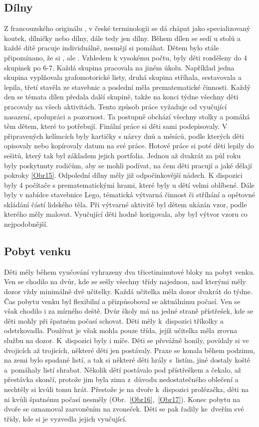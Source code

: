		\subsection{Dílny}
			Z francouzského originálu , v české terminologii se dá chápat jako specializovaný koutek, dílničky nebo dílny, dále tedy jen dílny. 
			Během dílen se sedí u stolů a každé dítě pracuje individuálně, nesmějí si pomáhat. Dětem bylo stále připomínano, že si , ale . Vzhledem k vysokému počtu, byly děti rozděleny do 4 skupinek po 6-7. Každá skupina pracovala na jiném úkolu. Například jedna skupina vyplňovala grafomotorické listy, druhá skupina stříhala, sestavovala a lepila, třetí stavěla ze stavebnic a poslední měla prematematické činnosti. Každý den se témata dílen předala další skupině, takže na konci týdne všechny děti pracovaly na všech aktivitách. Tento způsob práce vyžaduje od vyučující nasazení, spolupráci a pozornost. Ta postupně obchází všechny stolky a pomáhá těm dětem, které to potřebují. Finální práce si děti sami podepisovaly. V připravených kelímcích byly kartičky s názvy dnů a měsíců, podle kterých děti opisovaly nebo kopírovaly datum na své práce. Hotové práce si poté děti lepily do sešitů, který tak byl základem jejich portfolia. Jednou až dvakrát za půl roku byly poskytnuty rodičům, aby se mohli podívat, na čem děti pracují a jaké dělají pokroky \ref{Obr15}. Odpolední dílny měly již odpočinkovější nádech. K dispozici byly 4 počítače s prematematickými hrami, které byly u dětí velmi oblíbené. Dále byly v nabídce stavebnice Lego, tématická výtvarná činnost či stříhání a opětovné skládání částí lidského těla. Při výtvarné aktivitě byl dětem ukázán vzor, podle kterého měly malovat. Vyučující děti hodně korigovala, aby byl výtvor vzoru co nejpodobnější.


		\subsection{Pobyt venku}
		\label{prestavka}
			Děti měly během vyučování vyhrazeny dva třicetiminutové bloky na pobyt venku. Ven se chodilo na dvůr, kde se sešly všechny třídy najednou, nad kterými měly dozor vždy minimálně dvě učitelky. Každá učitelka měla dozor dvakrát do týdne. Čas pobytu venku byl flexibilní a přizpůsoboval se aktuálnímu počasí. Ven se však chodilo i za mírného deště. Dvůr školy má na jedné straně přístřešek, kde se děti mohly při špatném počasí schovat. Děti měly k dispozici tříkolky a odstrkovadla. Používat je však mohla pouze třída, jejíž učitelka měla zrovna službu na dozor. K dispozici byly i míče. Děti se převážně honily, povídaly si ve dvojicích až trojicích, některé děti jen postávaly. Praxe se konala během podzimu, na zemi bylo spadané listí, a tak si některé děti hrály s listím, jiné dostaly koště a pomáhaly listí shrabat. Několik dětí postávalo pod přístřeškem a čekalo, až přestávka skončí, protože jim byla zima z důvodu nedostatečného oblečení a nechtěly si kvůli tomu hrát. Přestože je na dvoře k dispozici prolézačka, děti na ni kvůli špatnému počasí nesměly (Obr.~\ref{Obr16},~\ref{Obr17}). 
			Konec pobytu na dvoře se oznamoval zazvoněním na zvoneček. Děti se pak řadily ke dveřím své třídy, kde si je vyzvedla jejich vyučující. 

